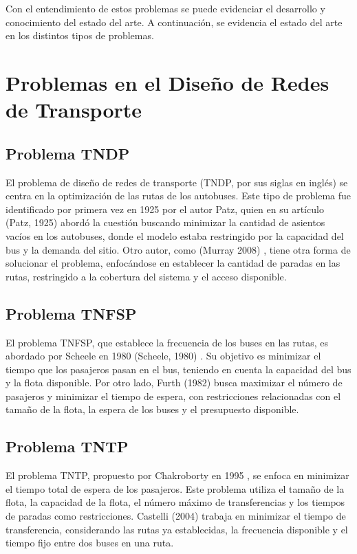 \documentclass[preprint,11pt]{elsarticle}
\begin{document}
Con el entendimiento de estos problemas se puede evidenciar el desarrollo y conocimiento del estado del arte. A continuación, se evidencia el estado del arte en los distintos tipos de problemas.

\section{Problemas en el Diseño de Redes de Transporte}

\subsection{Problema TNDP}

El problema de diseño de redes de transporte (TNDP, por sus siglas en inglés) se centra en la optimización de las rutas de los autobuses. Este tipo de problema fue identificado por primera vez en 1925 por el autor Patz, quien en su artículo (Patz, 1925)  \cite{patz1925} abordó la cuestión buscando minimizar la cantidad de asientos vacíos en los autobuses, donde el modelo estaba restringido por la capacidad del bus y la demanda del sitio. Otro autor, como (Murray 2008) \cite{murray2003}, tiene otra forma de solucionar el problema, enfocándose en establecer la cantidad de paradas en las rutas, restringido a la cobertura del sistema y el acceso disponible.

\subsection{Problema TNFSP}

El problema TNFSP, que establece la frecuencia de los buses en las rutas, es abordado por Scheele en 1980 (Scheele, 1980) \cite{scheele1980}. Su objetivo es minimizar el tiempo que los pasajeros pasan en el bus, teniendo en cuenta la capacidad del bus y la flota disponible. Por otro lado, Furth (1982) \cite{furth1982} busca maximizar el número de pasajeros y minimizar el tiempo de espera, con restricciones relacionadas con el tamaño de la flota, la espera de los buses y el presupuesto disponible.

\subsection{Problema TNTP}

El problema TNTP, propuesto por Chakroborty en 1995 \cite{chakroborty1995}, se enfoca en minimizar el tiempo total de espera de los pasajeros. Este problema utiliza el tamaño de la flota, la capacidad de la flota, el número máximo de transferencias y los tiempos de paradas como restricciones. Castelli (2004) \cite{castelli2004} trabaja en minimizar el tiempo de transferencia, considerando las rutas ya establecidas, la frecuencia disponible y el tiempo fijo entre dos buses en una ruta.
\end{document}
